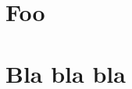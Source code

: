 \documentclass{article}
\newcommand\mysec[2][\xxx]{%
  \def\xxx{#2}%
  \section[#1]{#2}%
}
\begin{document}
\tableofcontents
\mysec{Foo}
\mysec[Blx]{Bla bla bla}
\end{document}
